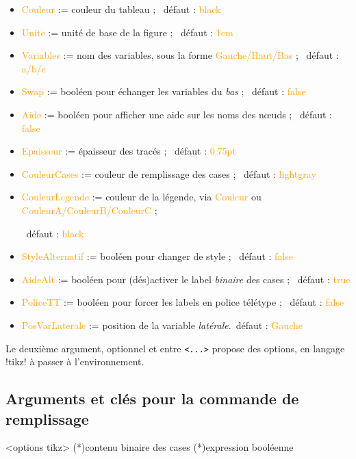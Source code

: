 \documentclass[french,a4paper,11pt]{article}
\newcommand\Cle[1]{{\small\sffamily\textlangle \textcolor{orange}{#1}\textrangle}}
\begin{document}
{{\begin{tipblock}
\begin{itemize}
	\item \Cle{Couleur} := couleur du tableau ; \hfill~défaut : \Cle{black}
	\item \Cle{Unite} := unité de base de la figure ; \hfill~défaut : \Cle{1cm}
	\item \Cle{Variables} := nom des variables, sous la forme \Cle{Gauche/Haut/Bas} ; \hfill~défaut : \Cle{a/b/c}
	\item \Cle{Swap} := booléen pour échanger les variables du \textit{bas} ; \hfill~défaut : \Cle{false}
	\item \Cle{Aide} := booléen pour afficher une aide sur les noms des nœuds ; \hfill~défaut : \Cle{false}
	\item \Cle{Epaisseur} := épaisseur des tracés ; \hfill~défaut : \Cle{0.75pt}
	\item \Cle{CouleurCases} := couleur de remplissage des cases ; \hfill~défaut : \Cle{lightgray}
	\item \Cle{CouleurLegende} := couleur de la légende, via \Cle{Couleur} ou \Cle{CouleurA/CouleurB/CouleurC} ;

	\hfill~défaut : \Cle{black}
	\item \Cle{StyleAlternatif} := booléen pour changer de style ; \hfill~défaut : \Cle{false}
	\item \Cle{AideAlt} := booléen pour (dés)activer le label \textit{binaire} des cases ; \hfill~défaut : \Cle{true}
	\item \Cle{PoliceTT} := booléen pour forcer les labels en police télétype ; \hfill~défaut : \Cle{false}
	\item \Cle{PosVarLaterale} := position de la variable \textit{latérale}.\hfill~défaut : \Cle{Gauche}
\end{itemize}

Le deuxième argument, optionnel et entre \texttt{<...>} propose des options, en langage \packagetex!tikz! à passer à l'environnement.
\end{tipblock}

\subsection{Arguments et clés pour la commande de remplissage}

\begin{DemoCode}
\begin{TableKarnaugh}[clés]<options tikz>
	\KarnaughCasesResult(*){contenu binaire des cases}
	\KarnaughCasesAuto(*){expression booléenne}
\end{TableKarnaugh}
\end{DemoCode}

}}
\end{document}
